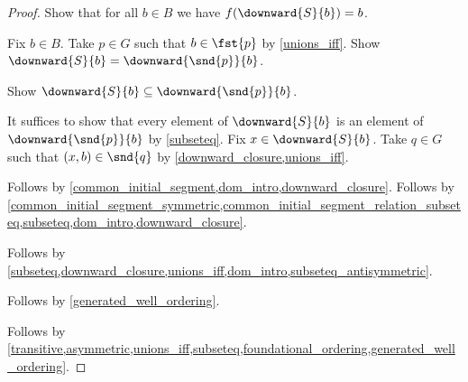 \begin{proof}
    Show that for all $b\in B$ we have $f(\downward{S}{b})=b$.
    \begin{subproof}
        Fix $b\in B$.
        Take $p\in G$ such that $b\in\fst{p}$ by \cref{unions_iff}.
        Show $\downward{S}{b}=\downward{\snd{p}}{b}$.
        \begin{subproof}
            Show $\downward{S}{b}\subseteq\downward{\snd{p}}{b}$.
            \begin{subproof}
                It suffices to show that every element of $\downward{S}{b}$ is an element of $\downward{\snd{p}}{b}$
                    by \cref{subseteq}.
                Fix $x\in\downward{S}{b}$.
                Take $q\in G$ such that $(x,b)\in\snd{q}$ by \cref{downward_closure,unions_iff}.
                \begin{byCase}
                    Follows by \cref{common_initial_segment,dom_intro,downward_closure}.
                    Follows by \cref{common_initial_segment_symmetric,common_initial_segment_relation_subseteq,subseteq,dom_intro,downward_closure}.
                \end{byCase}
            \end{subproof}
            Follows by \cref{subseteq,downward_closure,unions_iff,dom_intro,subseteq_antisymmetric}.
        \end{subproof}
        Follows by \cref{generated_well_ordering}.
    \end{subproof}

    Follows by \cref{transitive,asymmetric,unions_iff,subseteq,foundational_ordering,generated_well_ordering}.
\end{proof}

